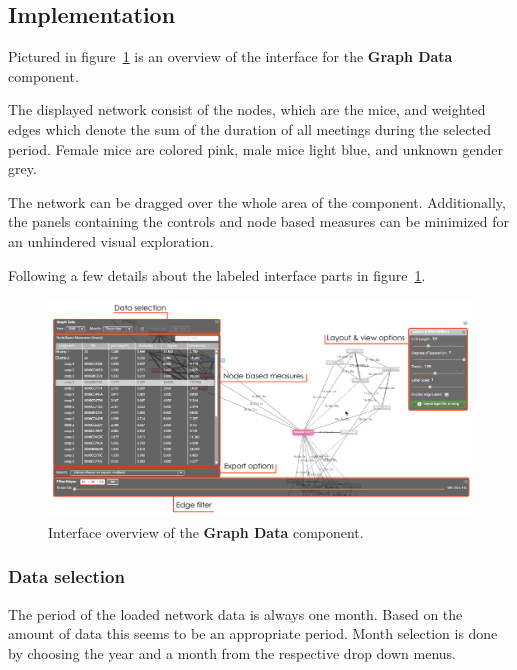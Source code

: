 \clearpage

\subsection{Implementation}
\label{subsec:graph_explore}

Pictured in figure~\ref{fig:graph_data_interface_overview} is an overview of the interface for the \textbf{Graph Data} component. 

The displayed network consist of the nodes, which are the mice, and weighted edges which denote the sum of the duration of all meetings during the selected period. Female mice are colored pink, male mice light blue, and unknown gender grey. 

The network can be dragged over the whole area of the component. Additionally, the panels containing the controls and node based measures can be minimized for an unhindered visual exploration.

Following a few details about the labeled interface parts in figure~\ref{fig:graph_data_interface_overview}.

\begin{figure}[htbp]
\begin{center}
  \includegraphics[width=\textwidth]{assets/pdf/graph_data_interface_overview.pdf}
  \caption[Graph Data interface overview]{Interface overview of the \textbf{Graph Data} component.}
  \label{fig:graph_data_interface_overview}
\end{center}
\end{figure}

\subsubsection*{Data selection}
The period of the loaded network data is always one month. Based on the amount of data this seems to be an appropriate period. Month selection is done by choosing the year and a month from the respective drop down menus.    

